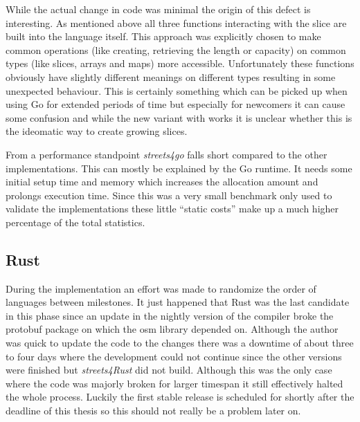 While the actual change in code was minimal the origin of this defect is interesting. As mentioned above all three functions interacting with the slice are built into the language itself. This approach was explicitly chosen to make common operations (like creating, retrieving the length or capacity) on common types (like slices, arrays and maps) more accessible. Unfortunately these functions obviously have slightly different meanings on different types resulting in some unexpected behaviour. This is certainly something which can be picked up when using Go for extended periods of time but especially for newcomers it can cause some confusion and while the new variant with  works it is unclear whether this is the ideomatic way to create growing slices.

From a performance standpoint \textit{streets4go} falls short compared to the other implementations. This can mostly be explained by the Go runtime. It needs some initial setup time and memory which increases the allocation amount and prolongs execution time. Since this was a very small benchmark only used to validate the implementations these little ``static costs'' make up a much higher percentage of the total statistics.

\subsection{Rust}
\label{subsec:Implementation::Verification::Rust}

During the implementation an effort was made to randomize the order of languages between milestones. It just happened that Rust was the last candidate in this phase since an update in the nightly version of the compiler broke the \gls{protobuf} package on which the \gls{osm} library depended on. Although the author was quick to update the code to the changes there was a downtime of about three to four days where the development could not continue since the other versions were finished but \textit{streets4Rust} did not build. Although this was the only case where the code was majorly broken for larger timespan it still effectively halted the whole process. Luckily the first stable release is scheduled for shortly after the deadline of this thesis so this should not really be a problem later on.

